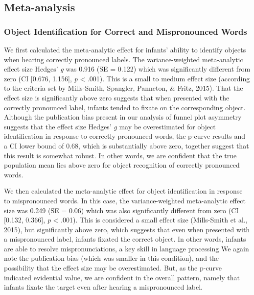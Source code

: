 \documentclass[man]{apa6}
\begin{document}
\hypertarget{meta-analysis-1}{%
\subsection{Meta-analysis}\label{meta-analysis-1}}

\hypertarget{object-identification-for-correct-and-mispronounced-words}{%
\subsubsection{Object Identification for Correct and Mispronounced Words}\label{object-identification-for-correct-and-mispronounced-words}}

We first calculated the meta-analytic effect for infants' ability to identify objects when hearing correctly pronounced labels. The variance-weighted meta-analytic effect size Hedges' \emph{g} was 0.916 (SE = 0.122) which was significantly different from zero (CI {[}0.676, 1.156{]}, \emph{p} \textless{} .001). This is a small to medium effect size (according to the criteria set by Mills-Smith, Spangler, Panneton, \& Fritz, 2015). That the effect size is significantly above zero suggests that when presented with the correctly pronounced label, infants tended to fixate on the corresponding object. Although the publication bias present in our analysis of funnel plot asymmetry suggests that the effect size Hedges' \emph{g} may be overestimated for object identification in response to correctly pronounced words, the p-curve results and a CI lower bound of 0.68, which is substantially above zero, together suggest that this result is somewhat robust. In other words, we are confident that the true population mean lies above zero for object recognition of correctly pronounced words.

We then calculated the meta-analytic effect for object identification in response to mispronounced words. In this case, the variance-weighted meta-analytic effect size was 0.249 (SE = 0.06) which was also significantly different from zero (CI {[}0.132, 0.366{]}, \emph{p} \textless{} .001). This is considered a small effect size (Mills-Smith et al., 2015), but significantly above zero, which suggests that even when presented with a mispronounced label, infants fixated the correct object. In other words, infants are able to resolve mispronunciations, a key skill in language processing We again note the publication bias (which was smaller in this condition), and the possibility that the effect size may be overestimated. But, as the p-curve indicated evidential value, we are confident in the overall pattern, namely that infants fixate the target even after hearing a mispronounced label.
\end{document}

